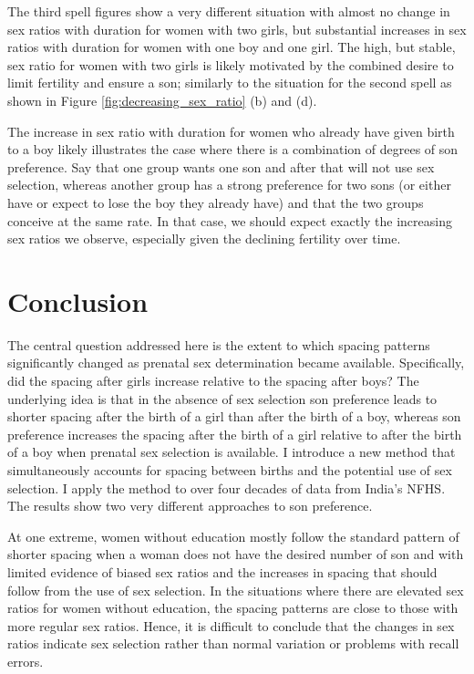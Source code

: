\documentclass[12pt,letterpaper]{article}
\begin{document}
The third spell figures show a very different situation with almost no 
change in sex ratios with duration for women with two girls, but substantial 
increases in sex ratios with duration for women with one boy and one girl.
The high, but stable, sex ratio for women with two girls is likely 
motivated by the combined desire to limit fertility and ensure a son;
similarly to the situation for the second spell as shown in 
Figure \ref{fig:decreasing_sex_ratio} (b) and (d).

The increase in sex ratio with duration for women who already have
given birth to a boy likely illustrates the case where there is a
combination of degrees of son preference.
Say that one group wants one son and after that will not use sex
selection, whereas another group has a strong preference for two
sons (or either have or expect to lose the boy they already have)
and that the two groups conceive at the same rate.
In that case, we should expect exactly the increasing sex ratios
we observe, especially given the declining fertility over time.


\section{Conclusion\label{sec:conclusion}}


The central question addressed here is the extent to which spacing patterns 
significantly changed as prenatal sex determination became available.
Specifically, did the spacing after girls increase relative to the spacing
after boys?
The underlying idea is that in the absence of sex selection son 
preference leads to shorter spacing after the birth of a girl than after the 
birth of a boy, whereas son preference increases the spacing after the birth 
of a girl relative to after the birth of a boy when prenatal sex selection is 
available.
I introduce a new method that simultaneously accounts for spacing
between births and the potential use of sex selection. 
I apply the method to over four decades of data from India's NFHS.
The results show two very different approaches to son preference.

At one extreme, women without education mostly follow the standard 
pattern of shorter spacing when a woman does not have the desired number of 
son and with limited evidence of biased sex ratios and the increases in
spacing that should follow from the use of sex selection.
 In the situations where there are elevated sex ratios for women without
education, the spacing patterns are close to those with more regular sex
ratios. 
Hence, it is difficult to conclude that the changes in sex
ratios indicate sex selection rather than normal variation or problems
with recall errors.
\end{document}
